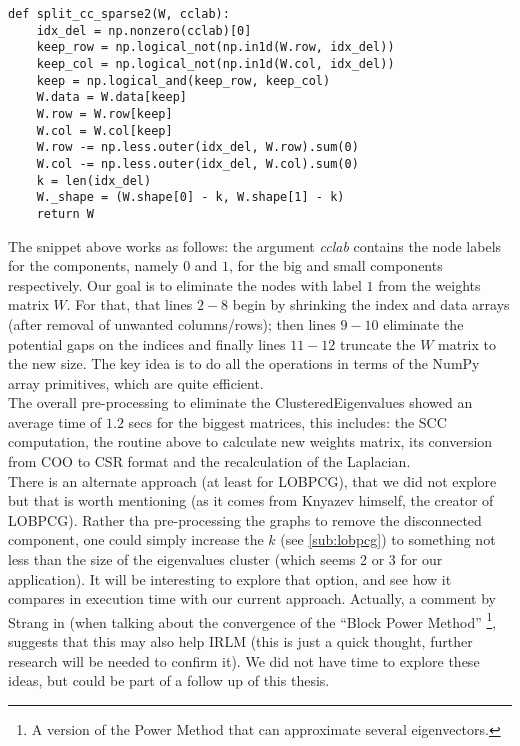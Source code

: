     \begin{lstlisting}
def split_cc_sparse2(W, cclab):
    idx_del = np.nonzero(cclab)[0]
    keep_row = np.logical_not(np.in1d(W.row, idx_del))
    keep_col = np.logical_not(np.in1d(W.col, idx_del))
    keep = np.logical_and(keep_row, keep_col)
    W.data = W.data[keep]
    W.row = W.row[keep]
    W.col = W.col[keep]
    W.row -= np.less.outer(idx_del, W.row).sum(0)
    W.col -= np.less.outer(idx_del, W.col).sum(0)
    k = len(idx_del)
    W._shape = (W.shape[0] - k, W.shape[1] - k)
    return W
    \end{lstlisting}
    \joinbelow{1cm}
    
The snippet above works as follows: the argument
\emph{cclab} contains the node labels for the components, namely $0$ and $1$,
for the big and small components respectively. Our goal is to
eliminate the nodes with 
label $1$ from the weights matrix $W$. For that, that lines $2-8$
begin by shrinking the index and data arrays (after removal of unwanted
columns/rows); then lines $9-10$ eliminate the potential gaps on the
indices and finally lines $11-12$ truncate the $W$ matrix to the new
size. The key idea is to do all the operations in terms of the NumPy
\cite{numpy} array primitives, which are quite efficient. \\

The overall pre-processing to eliminate the \gls{ClusteredEigenvalues} 
showed an average time of $1.2$ secs for the biggest
matrices, this includes: the \gls{SCC} computation, the routine above
to calculate new weights matrix, its conversion from COO
to CSR format and the recalculation of the \gls{Laplacian}. \\

There is an alternate approach (at least for \gls{LOBPCG}), that we
did not explore but that is worth mentioning (as it comes from Knyazev
himself, the creator of \gls{LOBPCG}). Rather tha pre-processing the
graphs to remove the disconnected component, one could simply
increase the $k$ (see \cref{sub:lobpcg}) to something not less than
the size of the eigenvalues cluster (which  
seems 2 or 3 for our application). It will be interesting to 
explore that option, and see how it compares in execution time
with our current approach. Actually, a comment by Strang in
\cite{strang88} (when talking about the convergence of the ``Block
Power Method'' \footnote{A version of the Power Method that can
  approximate several eigenvectors.}, suggests that this may
also help \gls{IRLM} (this is 
just a quick thought, further research will be needed to confirm
it). We did not have time to explore these ideas, but could be part of
a follow up of this thesis.

